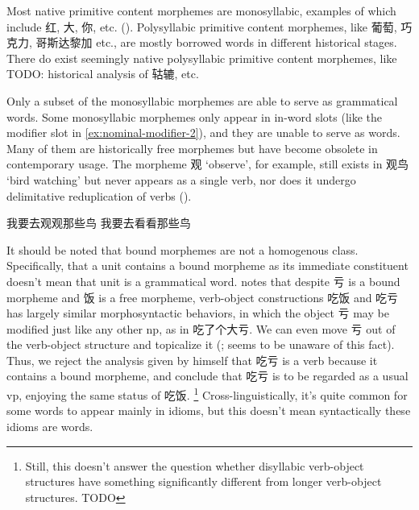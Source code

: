 \documentclass[UTF8, a4paper, oneside, scheme=plain]{ctexrep}
\newcommand*{\citesec}[1]{\S~{#1}}
\newcommand{\translate}[1]{`#1'}
\begin{document}
Most native primitive content morphemes 
are monosyllabic, examples of which include 红, 大, 你, etc.
().
Polysyllabic primitive content morphemes,
like 葡萄, 巧克力, 哥斯达黎加 etc., 
are mostly borrowed words
in different historical stages.
There do exist seemingly native polysyllabic primitive content morphemes,
like TODO: historical analysis of 轱辘, etc.

Only a subset of the monosyllabic morphemes are able to serve as grammatical words.
Some monosyllabic morphemes only appear in in-word slots 
(like the modifier slot in \eqref{ex:nominal-modifier-2}),
and they are unable to serve as words.
Many of them are historically free morphemes
but have become obsolete in contemporary usage.
The morpheme 观 \translate{observe}, for example,
still exists in 观鸟 \translate{bird watching}
but never appears as a single verb, 
nor does it undergo delimitative reduplication of verbs
().

\begin{exe}
    \ex\label{ex:pos.obsolete-1} \begin{xlist}
        \ex *我要去观观那些鸟
        \ex 我要去看看那些鸟
    \end{xlist}
\end{exe}

It should be noted that bound morphemes are not a homogenous class.
Specifically, that a unit contains a bound morpheme as its immediate constituent
doesn't mean that unit is a grammatical word.
\citet[\citesec{8.3.2}]{zhudexigrammar} notes that 
despite 亏 is a bound morpheme and 饭 is a free morpheme,
verb-object constructions 吃饭 and 吃亏 has largely similar morphosyntactic behaviors,
in which the object 亏 may be modified just like any other \acs{np}, 
as in 吃了个大亏.
We can even move 亏 out of the verb-object structure
and topicalize it (; 
\citet{zhudexigrammar} seems to be unaware of this fact).
Thus, we reject the analysis given by \citet[\citesec{8.3.2}]{zhudexigrammar} himself
that 吃亏 is a verb because it contains a bound morpheme, 
and conclude that 吃亏 is to be regarded 
as a usual \acs{vp},
enjoying the same status of 吃饭.%
\footnote{
    Still, this doesn't answer the question whether disyllabic verb-object structures 
    have something significantly different 
    from longer verb-object structures. TODO
}
Cross-linguistically, 
it's quite common for some words to appear mainly in idioms, 
but this doesn't mean syntactically
these idioms are words.
\end{document}
